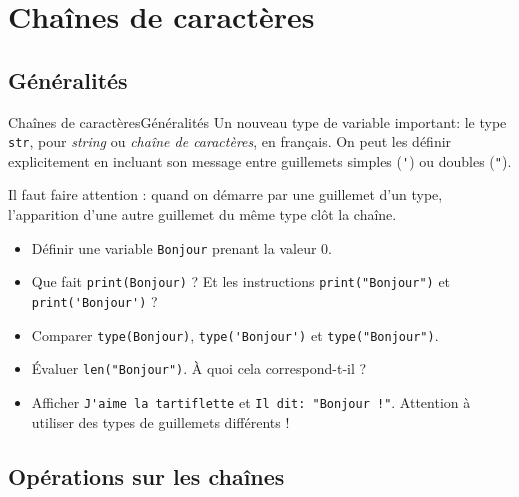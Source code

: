 \section{Chaînes de caractères}
\subsection{Généralités}

\begin{frame}[fragile]{Chaînes de caractères}{Généralités}
Un nouveau type de variable important: le type \lstinline|str|, pour \textit{string} ou \textit{chaîne de caractères}, en français. On peut les définir explicitement en incluant son message entre guillemets simples (\lstinline|'|) ou doubles (\lstinline|"|).\pause

Il faut faire attention : quand on démarre par une guillemet d'un type, l'apparition d'une autre guillemet du même type clôt la chaîne.\pause

	\begin{exo}
	
	\begin{itemize}[<+->]
	\item Définir une variable \lstinline|Bonjour| prenant la valeur $0$.
	
	\item Que fait \lstinline|print(Bonjour)| ? Et les instructions \lstinline|print("Bonjour")| et \lstinline|print('Bonjour')| ?
	
	\item Comparer \lstinline|type(Bonjour)|, \lstinline|type('Bonjour')| et \lstinline|type("Bonjour")|.
	
	\item Évaluer \lstinline|len("Bonjour")|. À quoi cela correspond-t-il ?
    
    \item Afficher \lstinline|J'aime la tartiflette| et  \lstinline|Il dit: "Bonjour !"|. Attention à utiliser des types de guillemets différents !
    \end{itemize}
\end{exo}

\end{frame}

\subsection{Opérations sur les chaînes}

